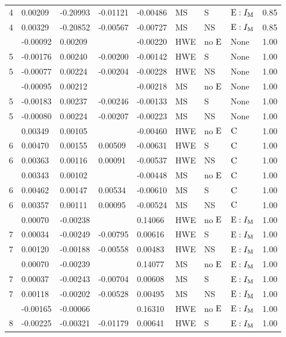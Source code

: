 \begin{longtable}[t]{lllllllll}
4 & 0.00209 & -0.20993 & -0.01121 & -0.00486 & MS & S & ${\rm E}:I_{{\rm M}}$ & 0.85\\
4 & 0.00329 & -0.20852 & -0.00567 & -0.00727 & MS & NS & ${\rm E}:I_{{\rm M}}$ & 0.85\\
\addlinespace
5 & -0.00092 & 0.00209 &  & -0.00220 & HWE & no ${\rm E}$ & None & 1.00\\
5 & -0.00176 & 0.00240 & -0.00200 & -0.00142 & HWE & S & None & 1.00\\
5 & -0.00077 & 0.00224 & -0.00204 & -0.00228 & HWE & NS & None & 1.00\\
\addlinespace
5 & -0.00095 & 0.00212 &  & -0.00218 & MS & no ${\rm E}$ & None & 1.00\\
5 & -0.00183 & 0.00237 & -0.00246 & -0.00133 & MS & S & None & 1.00\\
5 & -0.00080 & 0.00224 & -0.00207 & -0.00223 & MS & NS & None & 1.00\\
\addlinespace
6 & 0.00349 & 0.00105 &  & -0.00460 & HWE & no ${\rm E}$ & ${\rm C}$ & 1.00\\
6 & 0.00470 & 0.00155 & 0.00509 & -0.00631 & HWE & S & ${\rm C}$ & 1.00\\
6 & 0.00363 & 0.00116 & 0.00091 & -0.00537 & HWE & NS & ${\rm C}$ & 1.00\\
\addlinespace
6 & 0.00343 & 0.00102 &  & -0.00448 & MS & no ${\rm E}$ & ${\rm C}$ & 1.00\\
6 & 0.00462 & 0.00147 & 0.00534 & -0.00610 & MS & S & ${\rm C}$ & 1.00\\
6 & 0.00357 & 0.00111 & 0.00095 & -0.00524 & MS & NS & ${\rm C}$ & 1.00\\
\addlinespace
7 & 0.00070 & -0.00238 &  & 0.14066 & HWE & no ${\rm E}$ & ${\rm E}:I_{{\rm M}}$ & 1.00\\
7 & 0.00034 & -0.00249 & -0.00795 & 0.00616 & HWE & S & ${\rm E}:I_{{\rm M}}$ & 1.00\\
7 & 0.00120 & -0.00188 & -0.00558 & 0.00483 & HWE & NS & ${\rm E}:I_{{\rm M}}$ & 1.00\\
\addlinespace
7 & 0.00070 & -0.00239 &  & 0.14077 & MS & no ${\rm E}$ & ${\rm E}:I_{{\rm M}}$ & 1.00\\
7 & 0.00037 & -0.00243 & -0.00704 & 0.00608 & MS & S & ${\rm E}:I_{{\rm M}}$ & 1.00\\
7 & 0.00118 & -0.00202 & -0.00528 & 0.00495 & MS & NS & ${\rm E}:I_{{\rm M}}$ & 1.00\\
\addlinespace
8 & -0.00165 & -0.00066 &  & 0.16310 & HWE & no ${\rm E}$ & ${\rm E}:I_{{\rm M}}$ & 1.00\\
8 & -0.00225 & -0.00321 & -0.01179 & 0.00641 & HWE & S & ${\rm E}:I_{{\rm M}}$ & 1.00\\

\end{longtable}
